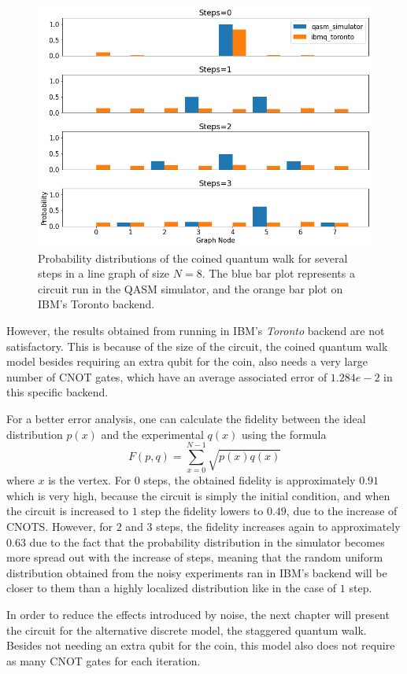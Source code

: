 \documentclass[../../dissertation.tex]{subfiles}
\begin{document}
\begin{figure}[!h]
	\centering
	\includegraphics[scale=0.40]{img/Qiskit/CoinedQuantumWalk/CoinedQW_N3_S0123.png}
	\caption{Probability distributions of the coined quantum walk for several steps in a line graph of size $N=8$. The blue bar plot represents a circuit run in the QASM simulator, and the orange bar plot on IBM's Toronto backend. } 
	\label{fig:coinedQWQiskitDist}
\end{figure}
However, the results obtained from running in IBM's \textit{Toronto} backend
are not satisfactory. This is because of the size of the circuit, the coined
quantum walk model besides requiring an extra qubit for the coin, also needs a
very large number of CNOT gates, which have an average associated error of
$1.284e-2$ in this specific backend.\par

For a better error analysis, one can calculate the fidelity between the
ideal distribution $p(x)$ and the experimental $q(x)$ using the formula
\begin{equation}
    F(p,q) = \sum_{x=0}^{N-1} \sqrt{p(x)q(x)}
    \label{eq:bestFid}
\end{equation}
where $x$ is the vertex. For $0$ steps, the obtained fidelity is approximately
$0.91$ which is very high, because the circuit is simply the initial condition,
and when the circuit is increased to $1$ step the fidelity lowers to $0.49$,
due to the increase of CNOTS. However, for $2$ and $3$ steps, the fidelity
increases again to approximately $0.63$ due to the fact that the probability
distribution in the simulator becomes more spread out with the increase of
steps, meaning that the random uniform distribution obtained from the noisy
experiments ran in IBM's backend will be closer to them than a highly localized
distribution like in the case of $1$ step.\par

In order to reduce the effects introduced by noise, the next chapter will
present the circuit for the alternative discrete model, the staggered quantum
walk. Besides not needing an extra qubit for the coin, this model also does not
require as many CNOT gates for each iteration.
\end{document}

